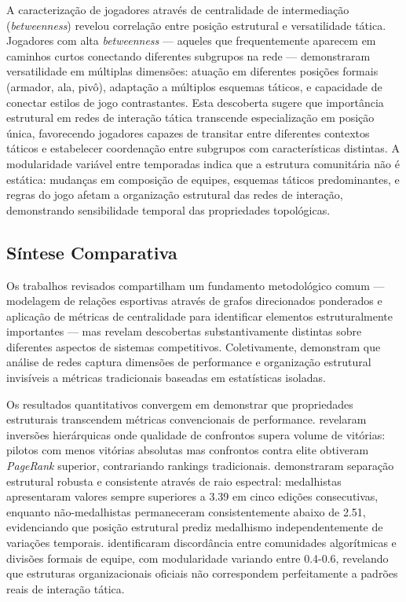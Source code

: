 A caracterização de jogadores através de centralidade de intermediação (\textit{betweenness}{}) revelou correlação entre posição estrutural e versatilidade tática. Jogadores com alta \textit{betweenness}{} --- aqueles que frequentemente aparecem em caminhos curtos conectando diferentes subgrupos na rede --- demonstraram versatilidade em múltiplas dimensões: atuação em diferentes posições formais (armador, ala, pivô), adaptação a múltiplos esquemas táticos, e capacidade de conectar estilos de jogo contrastantes. Esta descoberta sugere que importância estrutural em redes de interação tática transcende especialização em posição única, favorecendo jogadores capazes de transitar entre diferentes contextos táticos e estabelecer coordenação entre subgrupos com características distintas. A modularidade variável entre temporadas indica que a estrutura comunitária não é estática: mudanças em composição de equipes, esquemas táticos predominantes, e regras do jogo afetam a organização estrutural das redes de interação, demonstrando sensibilidade temporal das propriedades topológicas.

\subsection{Síntese Comparativa}

Os trabalhos revisados compartilham um fundamento metodológico comum --- modelagem de relações esportivas através de grafos direcionados ponderados e aplicação de métricas de centralidade para identificar elementos estruturalmente importantes --- mas revelam descobertas substantivamente distintas sobre diferentes aspectos de sistemas competitivos. Coletivamente, demonstram que análise de redes captura dimensões de performance e organização estrutural invisíveis a métricas tradicionais baseadas em estatísticas isoladas.

Os resultados quantitativos convergem em demonstrar que propriedades estruturais transcendem métricas convencionais de performance.  revelaram inversões hierárquicas onde qualidade de confrontos supera volume de vitórias: pilotos com menos vitórias absolutas mas confrontos contra elite obtiveram \textit{PageRank}{} superior, contrariando rankings tradicionais.  demonstraram separação estrutural robusta e consistente através de raio espectral: medalhistas apresentaram valores sempre superiores a 3.39 em cinco edições consecutivas, enquanto não-medalhistas permaneceram consistentemente abaixo de 2.51, evidenciando que posição estrutural prediz medalhismo independentemente de variações temporais.  identificaram discordância entre comunidades algorítmicas e divisões formais de equipe, com modularidade variando entre 0.4-0.6, revelando que estruturas organizacionais oficiais não correspondem perfeitamente a padrões reais de interação tática.

